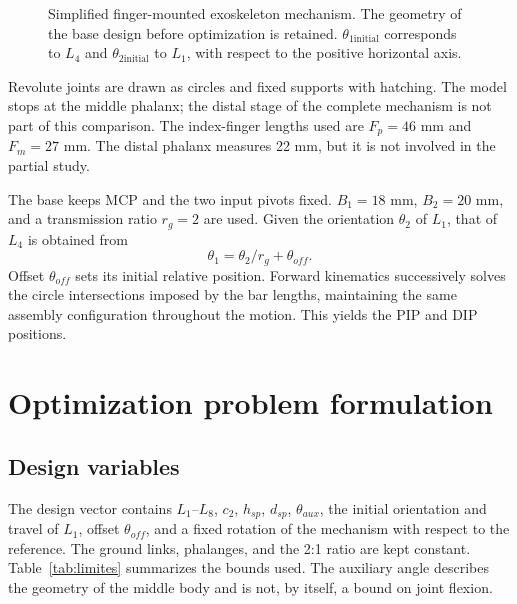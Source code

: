 \documentclass[conference,letterpaper]{IEEEtran}
\begin{document}
\begin{figure}[t]
\centering
\caption{Simplified finger-mounted exoskeleton mechanism. The geometry of the base design before optimization is retained. $\theta_{1\mathrm{initial}}$ corresponds to $L_4$ and $\theta_{2\mathrm{initial}}$ to $L_1$, with respect to the positive horizontal axis.}
\label{fig:dedo}
\end{figure}

Revolute joints are drawn as circles and fixed supports with hatching. The model stops at the middle phalanx; the distal stage of the complete mechanism is not part of this comparison. The index-finger lengths used are $F_p=46$ mm and $F_m=27$ mm. The distal phalanx measures 22 mm, but it is not involved in the partial study.

The base keeps MCP and the two input pivots fixed. $B_1=18$ mm, $B_2=20$ mm, and a transmission ratio $r_g=2$ are used. Given the orientation $\theta_2$ of $L_1$, that of $L_4$ is obtained from
\begin{equation}
\theta_1=\theta_2/r_g+\theta_{off}.
\end{equation}
Offset $\theta_{off}$ sets its initial relative position. Forward kinematics successively solves the circle intersections imposed by the bar lengths, maintaining the same assembly configuration throughout the motion. This yields the PIP and DIP positions.

\section{Optimization problem formulation}
\subsection{Design variables}
The design vector contains $L_1$--$L_8$, $c_2$, $h_{sp}$, $d_{sp}$, $\theta_{aux}$, the initial orientation and travel of $L_1$, offset $\theta_{off}$, and a fixed rotation of the mechanism with respect to the reference. The ground links, phalanges, and the 2:1 ratio are kept constant. Table~\ref{tab:limites} summarizes the bounds used. The auxiliary angle describes the geometry of the middle body and is not, by itself, a bound on joint flexion.
\end{document}
